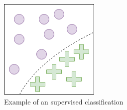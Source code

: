   
\begin{figure}
     \centering
     \begin{subfigure}[b]{0.34\textwidth}
         \centering
         \includegraphics[width=\textwidth]{background/figures/supervised_classification.png}
         \caption{Example of an supervised classification}
         \label{fig:supervised_calssification}
     \end{subfigure}
     \hspace{15px}
     \begin{subfigure}[b]{0.34\textwidth}
         \centering

\end{subfigure}
\end{figure}
